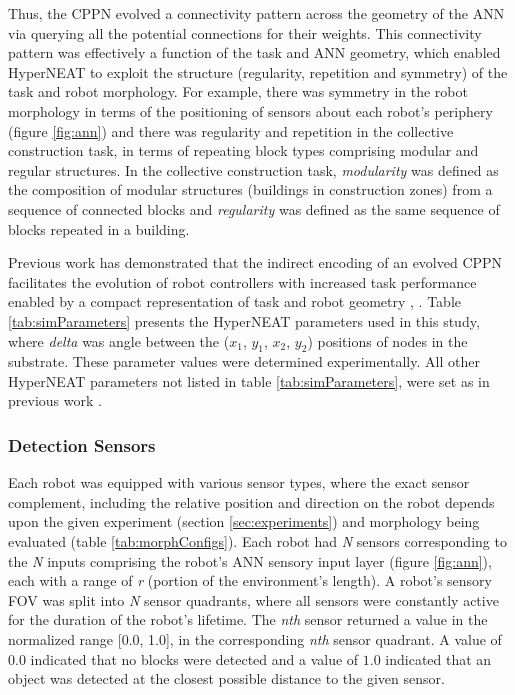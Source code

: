 Thus, the CPPN evolved a connectivity pattern across the geometry of the ANN via querying all the potential
connections for their weights.
This connectivity pattern was effectively a function of the task and ANN geometry,
which enabled HyperNEAT to exploit the structure (regularity, repetition and symmetry) of the task and robot morphology.
For example, there was symmetry in the robot morphology in terms of the positioning of sensors about each
robot's periphery (figure \ref{fig:ann}) and there was regularity and repetition in the collective construction
task, in terms of repeating block types comprising modular and regular structures.
In the collective construction task, \textit{modularity} was defined as the composition of modular structures
(buildings in construction zones) from a sequence of connected blocks and \textit{regularity} was defined
as the same sequence of blocks repeated in a building.

Previous work has demonstrated that the indirect encoding of an evolved CPPN facilitates the evolution of
robot controllers with increased task performance enabled by a compact representation
of task and robot geometry \cite{DAmbrosioStanley2008}, \cite{WatsonNitschke2015SSCI}.
Table \ref{tab:simParameters} presents the HyperNEAT parameters used in this study, where \textit{delta}
was angle between the ($x_{1}$, $y_{1}$, $x_{2}$, $y_{2}$) positions of nodes in the substrate.
These parameter values were determined experimentally.   All other HyperNEAT parameters not listed in
table \ref{tab:simParameters}, were set as in previous work \cite{DAmbrosioStanley2008}.

\subsubsection{Detection Sensors}
Each robot was equipped with various sensor types, where the exact sensor complement, including the
relative position and direction on the robot depends upon the given experiment
(section \ref{sec:experiments}) and morphology being evaluated (table \ref{tab:morphConfigs}).
Each robot had \textit{N} sensors corresponding to the \textit{N} inputs comprising the robot's
ANN sensory input layer (figure \ref{fig:ann}), each with a range of \textit{r}
(portion of the environment's length).
A robot's sensory FOV was split into \textit{N} sensor quadrants, where all sensors were constantly active
for the duration of the robot's lifetime.
The \textit{nth} sensor returned a value in the normalized range [0.0, 1.0],
in the corresponding \textit{nth} sensor quadrant.
A value of $0.0$ indicated that no blocks were detected and a value of $1.0$ indicated that an object was detected
at the closest possible distance to the given sensor.

